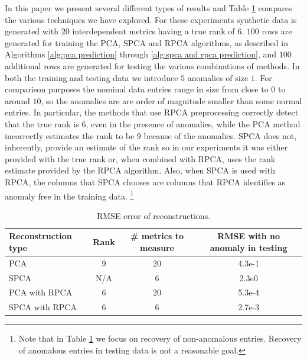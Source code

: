 \documentclass[conference]{IEEEtran}
\begin{document}
In this paper we present several different types of results and Table \ref{tab:table1} compares the various techniques we have explored. For these experiments synthetic data is generated with $20$ interdependent metrics having a true rank of $6$.  $100$ rows are generated for training the PCA, SPCA and RPCA algorithms, as described in Algorithms \ref{alg:pca prediction} through \ref{alg:spca and rpca prediction}, and $100$ additional rows are generated for testing the various combinations of methods.   In both the training and testing data we introduce $5$ anomalies of size $1$.  For comparison purposes the nominal data entries range in size from close to $0$ to around $10$, so the anomalies are are order of magnitude smaller than some normal entries.
In particular, the methods that use RPCA preprocessing correctly detect that the true rank is $6$, even in the presence of anomalies, while the PCA method incorrectly estimates the rank to be $9$ because of the anomalies.  SPCA does not, inherently, provide an estimate of the rank so in our experiments it was either provided with the true rank or, when combined with RPCA, uses the rank estimate provided by the RPCA algorithm.  Also, when SPCA is used with RPCA, the columns that SPCA chooses are columns that RPCA identifies as anomaly free in the training data. \footnote{Note that in Table \ref{tab:table1} we focus on recovery of non-anomalous entries.  Recovery of anomalous entries in testing data is not a reasonable goal.}
\begin{table}[h!]
    \begin{center}
      \caption{RMSE error of reconstructions.}
      \label{tab:table1}
      \begin{tabular}{l|c|c|c} %
        \textbf{Reconstruction type} & \textbf{Rank} & \begin{minipage}{0.42in}\textbf{\# metrics  to measure}\end{minipage}  & \begin{minipage}{0.50in}\textbf{RMSE with no anomaly in testing}\end{minipage} \\
        \hline
        PCA & 9 & 20 & 4.3e-1 \\
        SPCA &N/A & 6 & 2.3e0 \\
        PCA with RPCA & 6 & 20 & 5.3e-4 \\
        SPCA with RPCA & 6 & 6 & 2.7e-3 \\
      \end{tabular}
    \end{center}
\end{table}
\end{document}
